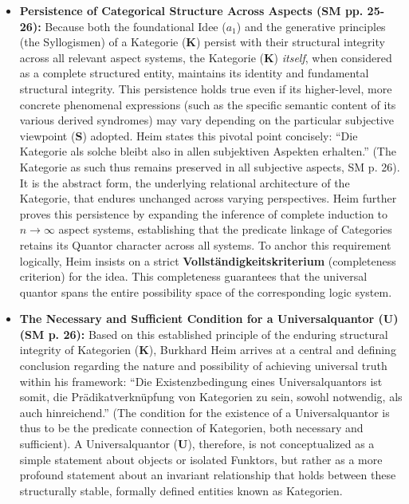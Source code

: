 \documentclass[12pt]{article}
\newcommand{\q}[1]{\enquote{#1}}
\newcommand{\kategorie}{\bm{K}}
\newcommand{\conceptualsyndrome}{a} %
\newcommand{\universalquantor}{\bm{U}}
\begin{document}
\begin{itemize}
    \item \textbf{Persistence of Categorical Structure Across Aspects (SM pp. 25-26):}
    Because both the foundational Idee (\(\conceptualsyndrome_1\)) and the generative principles (the Syllogismen) of a Kategorie (\(\kategorie\)) persist with their structural integrity across all relevant aspect systems, the Kategorie (\(\kategorie\)) \textit{itself}, when considered as a complete structured entity, maintains its identity and fundamental structural integrity. This persistence holds true even if its higher-level, more concrete phenomenal expressions (such as the specific semantic content of its various derived syndromes) may vary depending on the particular subjective viewpoint (\(\mathbf{S}\)) adopted. Heim states this pivotal point concisely: \q{Die Kategorie als solche bleibt also in allen subjektiven Aspekten erhalten.} (The Kategorie as such thus remains preserved in all subjective aspects, SM p. 26). It is the abstract form, the underlying relational architecture of the Kategorie, that endures unchanged across varying perspectives. Heim further proves this persistence by expanding the inference of complete induction to \( n \to \infty \) aspect systems, establishing that the predicate linkage of Categories retains its Quantor character across all systems. To anchor this requirement logically, Heim insists on a strict \textbf{Vollständigkeitskriterium} (completeness criterion) for the idea. This completeness guarantees that the universal quantor spans the entire possibility space of the corresponding logic system.

    \item \textbf{The Necessary and Sufficient Condition for a Universalquantor (\(\universalquantor\)) (SM p. 26):}
    Based on this established principle of the enduring structural integrity of Kategorien (\(\kategorie\)), Burkhard Heim arrives at a central and defining conclusion regarding the nature and possibility of achieving universal truth within his framework: \q{Die Existenzbedingung eines Universalquantors ist somit, die Prädikatverknüpfung von Kategorien zu sein, sowohl notwendig, als auch hinreichend.} (The condition for the existence of a Universalquantor is thus to be the predicate connection of Kategorien, both necessary and sufficient). A Universalquantor (\(\universalquantor\)), therefore, is not conceptualized as a simple statement about objects or isolated Funktors, but rather as a more profound statement about an invariant relationship that holds between these structurally stable, formally defined entities known as Kategorien.


\end{itemize}
\end{document}

